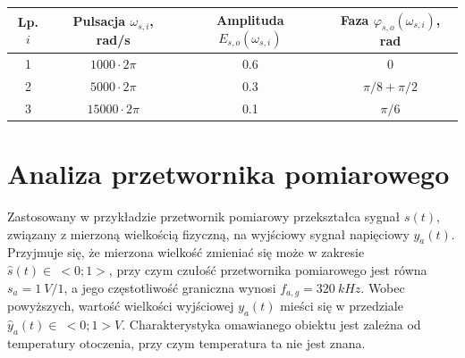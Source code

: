 \begin{table}[htb!]
\begin{center}
\begin{tabular}[c]{| c | c | c | c |} \hline
\textbf{Lp. $i$} & \textbf{Pulsacja $\omega_{s,i}$, rad/s} & \textbf{Amplituda $E_{s,o}(\omega_{s,i})$} & \textbf{Faza $\varphi_{s,o}(\omega_{s,i})$, rad} \\ \hline
1 & $1000  \cdot 2\pi$ &  0.6 & $0$             \\ \hline
2 & $5000  \cdot 2\pi$ &  0.3 & $\pi/8 + \pi/2$ \\ \hline
3 & $15000 \cdot 2\pi$ &  0.1 & $\pi/6$         \\ \hline
\end{tabular}
\end{center}
\end{table}

\section{Analiza przetwornika pomiarowego}

Zastosowany w przykładzie przetwornik pomiarowy przekształca sygnał $s(t)$, związany z mierzoną wielkością fizyczną, na wyjściowy sygnał napięciowy $y_{a}(t)$. Przyjmuje się, że mierzona wielkość zmieniać się może w zakresie $\hat{s}(t) \in~<0;1>$, przy czym czułość przetwornika pomiarowego jest równa $s_{a} = \qty{1}{V \per 1}$, a jego częstotliwość graniczna wynosi $f_{a,g} = \qty{320}{kHz}$. Wobec powyższych, wartość wielkości wyjściowej $y_{a}(t)$ mieści się w przedziale $\hat{y}_{a}(t) \in~<0;1>\unit{V}$. Charakterystyka omawianego obiektu jest zależna od temperatury otoczenia, przy czym temperatura ta nie jest znana.

